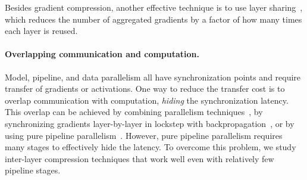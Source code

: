 Besides gradient compression, another effective technique is to use layer sharing~\citep{albert}, which reduces the number of aggregated gradients by a factor of how many times each layer is reused.

\paragraph{Overlapping communication and computation.}

Model, pipeline, and data parallelism all have synchronization points and require transfer of gradients or activations. One way to reduce the transfer cost is to overlap communication with computation, {\it hiding} the synchronization latency. This overlap can be achieved by combining parallelism techniques~\citep{krizhevsky2014oneweirdtrick, zero}, by synchronizing gradients layer-by-layer in lockstep with backpropagation~\citep{paszke2019pytorch}, or by using pure pipeline parallelism~\citep{huang2019gpipe,pipedream}.
However, pure pipeline parallelism requires many stages to effectively hide the latency. To overcome this problem, we study inter-layer compression techniques that work well even with relatively few pipeline stages.


